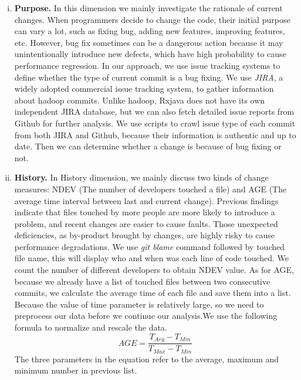 \begin{enumerate}[(i)]
	\item \noindent
	\textbf{Purpose.}
	In this dimension we mainly investigate the rationale of current changes. When programmers decide to change the code, their initial purpose can vary a lot, such as fixing bug, adding new features, improving features, etc.
	However, bug fix sometimes can be a dangerous action because it may unintentionally introduce new defects, which have high probability to cause performance regression. In our approach, we use issue tracking systems to define whether the type of current commit is a bug fixing. We use \textit{JIRA}, a widely adopted commercial issue tracking system, to gather information about hadoop commits. Unlike hadoop, Rxjava does not have its own independent JIRA database, but we can also fetch detailed issue reports from Github for further analysis. We use scripts to crawl issue type of each commit from both JIRA and Github, because their information is authentic and up to date. Then we can determine whether a change is because of bug fixing or not.
	
	\item \noindent
	\textbf{History.}
	In History dimension, we mainly discuss two kinds of change measures: NDEV (The number of developers touched a file) and AGE (The average time interval between last and current change). Previous findings indicate that files touched by more people are more likely to introduce a problem\cite{matsumoto2010analysis}, and recent changes are easier to cause faults\cite{eick2001does}. Those unexpected deficiencies, as by-product brought by changes, are highly risky to cause performance degradations. We use \textit{git blame} command followed by touched file name, this will display who and when was each line of code touched. We count the number of different developers to obtain NDEV value. As for AGE, because we already have a list of touched files between two consecutive commits, we calculate the average time of each file and save them into a list. Because the value of time parameter is relatively large, so we need to preprocess our data before we continue our analysis.We use the following formula to normalize and rescale the data.
	\begin{equation}
		AGE = \frac{T_{Avg}-T_{Min}}{T_{Max}-T_{Min}}
	\end{equation}
	The three parameters in the equation refer to the average, maximum and minimum number in previous list. 
	

\end{enumerate}

